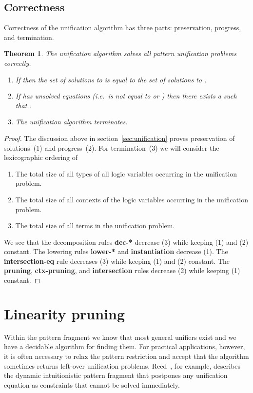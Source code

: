 \documentclass{eptcs}
\newtheorem{thm}{Theorem}[section]
\theoremstyle{definition}
\begin{document}
\subsection{Correctness}
Correctness of the unification algorithm has three parts: preservation,
progress, and termination.
\begin{thm}\label{thm:unif-correct}
The unification algorithm solves all pattern unification problems
correctly.
\begin{enumerate}
\item
If  then the set of solutions to  is equal to the set of
solutions to .
\item
If  has unsolved equations (i.e.\  is not equal to  or
) then there exists a  such that .
\item
The unification algorithm terminates.
\end{enumerate}
\end{thm}
\begin{proof}
The discussion above in section~\ref{sec:unification}
proves preservation of solutions~(1) and progress~(2).
For termination~(3) we will consider the lexicographic ordering of
\begin{enumerate}
\item
The total size of all types of all logic variables occurring in the
unification problem.
\item
The total size of all contexts of the logic variables occurring in the
unification problem.
\item
The total size of all terms in the unification problem.
\end{enumerate}
We see that the decomposition rules \textbf{dec-*} decrease (3) while
keeping (1) and (2) constant.  The lowering rules \textbf{lower-*} and
\textbf{instantiation} decrease (1).  The \textbf{intersection-eq} rule decreases
(3) while keeping (1) and (2) constant.  The \textbf{pruning},
\textbf{ctx-pruning}, and
\textbf{intersection} rules decrease (2) while keeping (1) constant.
\end{proof}

\section{Linearity  pruning}
Within the pattern fragment we know that most general unifiers exist
and we have a decidable algorithm for finding them.  For practical
applications, however, it is often necessary to relax the pattern
restriction and accept that the algorithm sometimes returns left-over
unification problems.  Reed~\cite{Reed09lfmtp}, for example, describes
the dynamic intuitionistic pattern fragment that postpones any
unification equation as constraints that cannot be solved immediately.
\end{document}
